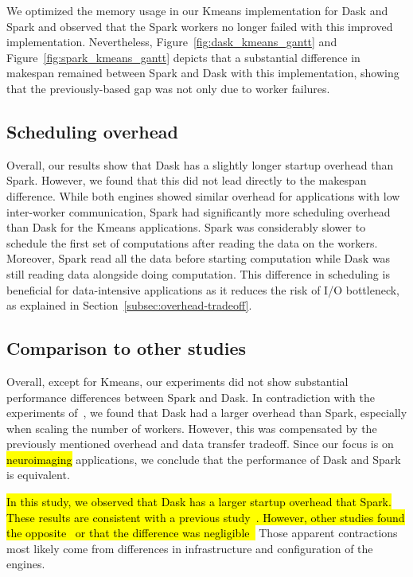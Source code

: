 \documentclass[AMA,STIX1COL]{WileyNJD-v2}
\newcommand{\HL}[1]{\hl{#1}}
\begin{document}
We optimized the memory usage in our Kmeans implementation for Dask and Spark
and observed that the Spark workers no longer failed with this improved implementation.
Nevertheless, Figure~{\ref{fig:dask_kmeans_gantt}} and Figure~{\ref{fig:spark_kmeans_gantt}} depicts that a substantial difference in makespan remained between Spark and Dask with this implementation,
showing that the previously-based gap was not only due to worker failures.
							
\subsection{Scheduling overhead}
Overall, our results show that Dask has a slightly longer startup overhead than Spark.
However, we found that this did not lead directly to the makespan difference.
While both engines showed similar overhead for applications with low inter-worker communication,
Spark had significantly more scheduling overhead than Dask for the Kmeans applications.
Spark was considerably slower to schedule the first set of computations after reading the data on the workers.
Moreover, Spark read all the data before starting computation while Dask was still reading data alongside doing computation.
This difference in scheduling is beneficial for data-intensive applications as it reduces the risk
of I/O bottleneck, as explained in Section~{\ref{subsec:overhead-tradeoff}}.
																	
\subsection{Comparison to other studies}
Overall, except for Kmeans, our experiments did not show substantial performance differences between Spark and Dask.
In contradiction with the experiments of~\cite{Mehta:17}, we found that Dask had a larger overhead than Spark, especially when scaling the number of workers.
However, this was compensated by the previously mentioned overhead and data transfer tradeoff.
Since our focus is on \HL{neuroimaging} applications, we conclude that the performance of Dask and Spark is equivalent.
				
\HL{
	In this study, we observed that Dask has a larger startup overhead that Spark.
	These results are consistent with a previous study~{\cite{Mehta:17}}.
	However, other studies found the opposite~{\cite{8588652}} or that the difference was negligible~{\cite{8943502}}
}
Those apparent contractions most likely come from differences in infrastructure and configuration of the engines.
																	
\end{document}
